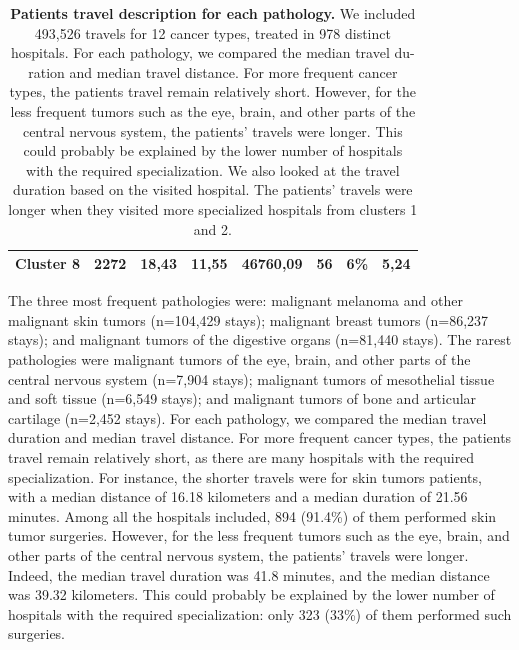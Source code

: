 \begin{table}[h]
{\begin{tabular}{|l|l|l|l|l|l|l|l|}
            Cluster 8                                                                        & 2272    & 18,43           & 11,55           & 46760,09       & 56       & 6\%       & 5,24               \\ \hline
        \end{tabular}
    } \caption{ \textbf{Patients travel description for each pathology.} We
        included 493,526 travels for 12 cancer types, treated in 978 distinct
        hospitals. For each pathology, we compared the median travel du-ration and
        median travel distance. For more frequent cancer types, the patients travel
        remain relatively short. However, for the less frequent tumors such as the
        eye, brain, and other parts of the central nervous system, the patients'
        travels were longer. This could probably be explained by the lower number of
        hospitals with the required specialization. We also looked at the travel
        duration based on the visited hospital. The patients' travels were longer
        when they visited more specialized hospitals from clusters 1 and 2. }
    \label{table:distance_and_co2}
\end{table}

The three most frequent pathologies were: malignant melanoma and other malignant
skin tumors (n=104,429 stays); malignant breast tumors (n=86,237 stays); and
malignant tumors of the digestive organs (n=81,440 stays). The rarest
pathologies were malignant tumors of the eye, brain, and other parts of the
central nervous system (n=7,904 stays); malignant tumors of mesothelial tissue
and soft tissue (n=6,549 stays); and malignant tumors of bone and articular
cartilage (n=2,452 stays). For each pathology, we compared the median travel
duration and median travel distance. For more frequent cancer types, the
patients travel remain relatively short, as there are many hospitals with the
required specialization. For instance, the shorter travels were for skin tumors
patients, with a median distance of 16.18 kilometers and a median duration of
21.56 minutes. Among all the hospitals included, 894 (91.4\%) of them performed
skin tumor surgeries. However, for the less frequent tumors such as the eye,
brain, and other parts of the central nervous system, the patients' travels were
longer. Indeed, the median travel duration was 41.8 minutes, and the median
distance was 39.32 kilometers. This could probably be explained by the lower
number of hospitals with the required specialization: only 323 (33\%) of them
performed such surgeries.

